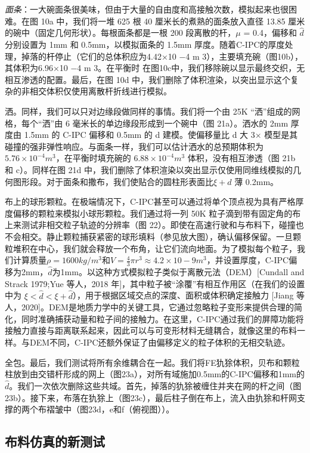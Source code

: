 \textit{面条}：一大碗面条很美味，但由于大量的自由度和高接触次数，模拟起来也很困难。在图 10a 中，我们将一堆 625 根 40 厘米长的煮熟的面条放入直径 13.85 厘米的碗中（固定几何形状）。每根面条都是一根 200 段离散的杆，$\mu$ = 0.4，偏移和 $\hat d$  分别设置为 1mm 和 0.5mm，以模拟面条的 1.5mm 厚度。随着C-IPC的厚度处理，掉落的杆停止（它们的总体积应为4.42×10 −4 m 3），主要填充碗（图10b），其体积为6.96×10 −4 m 3。在平衡时 在图10c中，我们移除碗以显示最终交织，无相互渗透的配置。最后，在图 10d 中，我们删除了体积渲染，以突出显示这个复杂的非相交体积仅使用离散杆折线进行模拟。

洒。同样，我们可以只对边缘段做同样的事情。我们将一个由 25K “洒”组成的网格，每个“洒”由 6 毫米长的单边缘段形成到一个碗中（图 21a）。洒水的 2mm 厚度由 1.5mm 的 C-IPC 偏移和 0.5mm 的 d 建模。使偏移量比 d 大 3× 模型是其碰撞的强非弹性响应。与面条一样，我们可以估计洒水的总预期体积为 $5.76 \times 10^{−4} m^3$，在平衡时填充碗的 $6.88 \times 10^{−4} m^3$ 体积，没有相互渗透（图 21b 和 c）。同样在图 21d 中，我们删除了体积渲染以突出显示仅使用同维线模拟的几何图形段。对于面条和撒布，我们使贴合的圆柱形表面比$\xi + d$ 薄 0.2mm。

布上的球形颗粒。在极端情况下，C-IPC甚至可以通过将单个顶点视为具有严格厚度偏移的颗粒来模拟小球形颗粒。我们通过将一列 50K 粒子滴到带有固定角的布上来测试非相交粒子轨迹的分辨率（图 22）。即使在高速行驶和与布料下，碰撞也不会相交。静止颗粒捕获紧密的球形填料（参见放大图），确认偏移保留。一旦颗粒堆积在中心，我们就会释放一个布角，让它们流向地面。为了模拟每个粒子，我们计算质量$\rho= 1600kg/m^3$和$V = \frac{4}{3}πr^3 \approx 4.2×10 −9 m^3$，并设置厚度，C-IPC偏移为2mm，$\hat d$为1mm。以这种方式模拟粒子类似于离散元法（DEM）[Cundall and Strack 1979;Yue 等人，2018 年]，其中粒子被“涂覆”有相互作用区（在我们的设置中为 $\xi < \hat d < \xi + \hat d$），用于根据区域交点的深度、面积或体积确定接触力 [Jiang 等人，2020]。DEM是地质力学中的关键工具，它通过忽略粒子变形来提供合理的简化，同时准确捕获动量和粒子间的接触力。在这里，C-IPC通过我们的屏障功能将接触力直接与距离联系起来，因此可以与可变形材料无缝耦合，就像这里的布料一样。与DEM不同，C-IPC还额外保证了由偏移定义的粒子体积的无相交轨迹。

全包。最后，我们测试将所有余维耦合在一起。我们将FE犰狳体积，贝布和颗粒柱放到由交错杆形成的网上（图23a），对所有域施加0.5mm的C-IPC偏移和1mm的$\hat d$。我们一次依次删除这些共域。首先，掉落的犰狳被缠住并夹在网的杆之间（图23b）。接下来，布落在犰狳上（图23c），最后柱子倒在布上，流入由犰狳和杆网支撑的两个布褶皱中（图23d，e和f（俯视图））。

\subsection{布料仿真的新测试}

